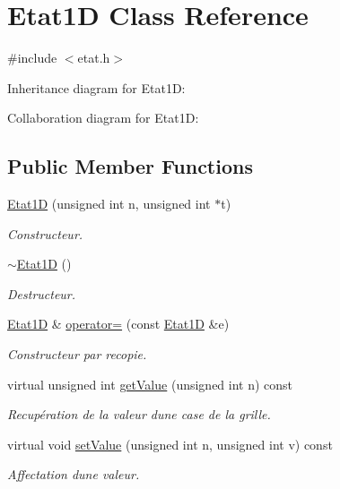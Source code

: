 \hypertarget{class_etat1_d}{}\section{Etat1D Class Reference}
\label{class_etat1_d}


{\ttfamily \#include $<$etat.\+h$>$}



Inheritance diagram for Etat1D\+:


Collaboration diagram for Etat1D\+:
\subsection*{Public Member Functions}
\begin{DoxyCompactItemize}
\item 
\mbox{\hyperlink{class_etat1_d_addea26818b2c60cff4da3b6277687c12}{Etat1D}} (unsigned int n, unsigned int $\ast$t)
\begin{DoxyCompactList}\small\item\em Constructeur. \end{DoxyCompactList}\item 
\mbox{\hyperlink{class_etat1_d_a71be5b5b3efb3451403184f31e63d6a2}{$\sim$\+Etat1D}} ()
\begin{DoxyCompactList}\small\item\em Destructeur. \end{DoxyCompactList}\item 
\mbox{\hyperlink{class_etat1_d}{Etat1D}} \& \mbox{\hyperlink{class_etat1_d_ac972b631c8448d479a7fbb230f70f480}{operator=}} (const \mbox{\hyperlink{class_etat1_d}{Etat1D}} \&e)
\begin{DoxyCompactList}\small\item\em Constructeur par recopie. \end{DoxyCompactList}\item 
virtual unsigned int \mbox{\hyperlink{class_etat1_d_ace95184883c3979e8778959966698dd4}{get\+Value}} (unsigned int n) const
\begin{DoxyCompactList}\small\item\em Recupération de la valeur d\textquotesingle{}une case de la grille. \end{DoxyCompactList}\item 
virtual void \mbox{\hyperlink{class_etat1_d_ac832c95a19cb5f21b76ca7595be2904a}{set\+Value}} (unsigned int n, unsigned int v) const
\begin{DoxyCompactList}\small\item\em Affectation d\textquotesingle{}une valeur. \end{DoxyCompactList}\end{DoxyCompactItemize}


